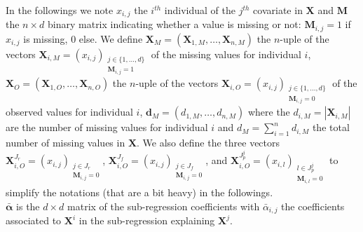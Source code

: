 \documentclass[12pt,a4paper]{report}
\begin{document}
	
	In the followings we note $x_{i,j}$ the $i^{th}$ individual of the $j^{th}$ covariate in $\boldsymbol{X}$ and $\boldsymbol{M}$ the $n\times d$ binary matrix indicating whether a value is missing or not: $\boldsymbol{M}_{i,j}=1$ if $x_{i,j}$ is missing, 0 else. 
	We define $\boldsymbol{X}_M=(\boldsymbol{X}_{1,M},\dots,\boldsymbol{X}_{n,M})$ the $n$-uple of the vectors $\boldsymbol{X}_{i,M}=(x_{i,j})_{\substack{j \in \{1,\dots,d \} \\ \boldsymbol{M}_{i,j}=1}}$ of the missing values for individual $i$, $\boldsymbol{X}_O=(\boldsymbol{X}_{1,O},\dots,\boldsymbol{X}_{n,O})$ the $n$-uple of the vectors $\boldsymbol{X}_{i,O}=\left(x_{i,j}\right)_{\substack{j \in \{1,\dots,d \} \\ \boldsymbol{M}_{i,j}=0}}$ of the observed values for individual $i$, $\boldsymbol{d}_M=(d_{1,M},\dots,d_{n,M})$ where the $d_{i,M}=|\boldsymbol{X}_{i,M} |$ are  the number of missing values for individual $i$ and $d_M=\sum_{i=1}^nd_{i,M}$ the total number of missing values in $\boldsymbol{X}$. We also define the three vectors $\boldsymbol{X}_{i,O}^{J_r}=\left(x_{i,j}\right)_{\substack{j \in J_r \\ \boldsymbol{M}_{i,j}=0}} $, $\boldsymbol{X}_{i,O}^{J_f}=\left(x_{i,j}\right)_{\substack{j \in J_f \\ \boldsymbol{M}_{i,j}=0}} $, and $\boldsymbol{X}_{i,O}^{J_p^j}=\left(x_{i,l}\right)_{\substack{l \in J_p^j \\ \boldsymbol{M}_{i,l}=0}} $ to simplify the notations (that are a bit heavy) in the followings.\\
	
	$\bar{\boldsymbol{\alpha}}$ is the $d\times d$ matrix of the sub-regression coefficients with $\bar{\alpha}_{i,j}$ the coefficients associated to $\boldsymbol{X}^i$ in the sub-regression explaining $\boldsymbol{X}^j$.\\  
	
\end{document}
